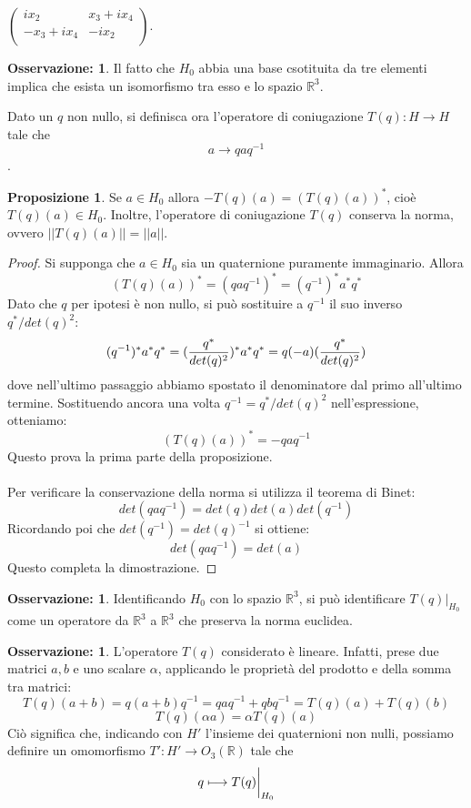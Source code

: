 \documentclass[12pt,a4paper]{report}
\theoremstyle{definition}
\theoremstyle{Theorem}
\newtheorem{Prop}[Def]{Proposizione}
\theoremstyle{definition}
\theoremstyle{definition}
\theoremstyle{definition}
\newtheorem{Obs}[Def]{Osservazione:}
\begin{document}
$\begin{pmatrix}
	ix_2 & x_3+ix_4\\
	-x_3+ix_4 & -ix_2\\
\end{pmatrix}$.
\begin{Obs}
	Il fatto che $H_0$ abbia una base csotituita da tre elementi implica che esista un isomorfismo tra esso e lo spazio $\mathbb{R}^3$.
\end{Obs}
Dato un $q$ non nullo, si definisca ora l'operatore di coniugazione
$T(q):H\longrightarrow H$ tale che
$$a\longrightarrow qaq^{-1}$$.
\begin{Prop}
	Se $a\in H_0$ allora $-T(q)(a)=(T(q)(a))^*$, cioè $T(q)(a)\in H_0$. Inoltre, l'operatore di coniugazione $T(q)$ conserva la norma, ovvero $||T(q)(a)||=||a||$.
\end{Prop}
\begin{proof}
	Si supponga che $a\in H_0$ sia un quaternione puramente immaginario. Allora $$(T(q)(a))^*=(qaq^{-1})^*=(q^{-1})^*a^*q^*$$
	Dato che $q$ per ipotesi è non nullo, si può sostituire a $q^{-1}$ il suo inverso $q^*/det(q)^2$:
	$$(q^{-1})^*a^*q^*=({q^*\over det(q)^2})^*a^*q^*=q(-a)({q^*\over det(q)^2})$$
	dove nell'ultimo passaggio abbiamo spostato il denominatore dal primo all'ultimo termine. Sostituendo ancora una volta $q^{-1}=q^*/det(q)^2$ nell'espressione, otteniamo:
	$$(T(q)(a))^*=-qaq^{-1}$$
	Questo prova la prima parte della proposizione.\\
	\\
	Per verificare la conservazione della norma si utilizza il teorema di Binet:
	$$det(qaq^{-1})=det(q)det(a)det(q^{-1})$$
	Ricordando poi che $det(q^{-1})=det(q)^{-1}$ si ottiene:
	$$det(qaq^{-1})=det(a)$$
	Questo completa la dimostrazione.
\end{proof}
\begin{Obs}
	Identificando $H_0$ con lo spazio $\mathbb{R}^3$, si può identificare $T(q)|_{H_0}$ come un operatore da $\mathbb{R}^3$ a $\mathbb{R}^3$ che preserva la norma euclidea.
\end{Obs}
\begin{Obs}
	L'operatore $T(q)$ considerato è lineare. Infatti, prese due matrici $a,b$ e uno scalare $\alpha$, applicando le proprietà del prodotto e della somma tra matrici: $$T(q)(a+b)=q(a+b)q^{-1}=qaq^{-1}+qbq^{-1}=T(q)(a)+T(q)(b)
	$$
	$$T(q)(\alpha a)=\alpha T(q)(a)$$
	Ciò significa che, indicando con $H'$ l'insieme dei quaternioni non nulli, possiamo definire un omomorfismo $T':H'\rightarrow O_3(\mathbb{R})$ tale che
	$$q\longmapsto T(q)\bigg{\rvert}_{H_0}$$
\end{Obs}
\end{document}
